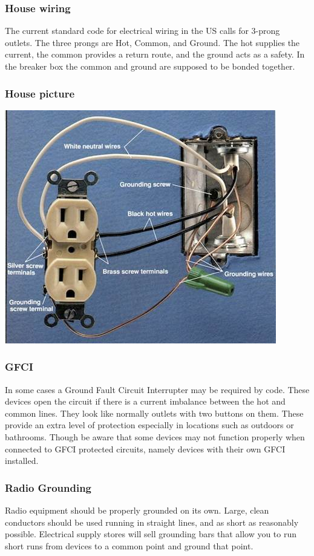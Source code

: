 \documentclass[10pt, handout]{beamer}
\begin{document}
\begin{frame}
\frametitle{House wiring}
The current standard code for electrical wiring in the US calls for 3-prong outlets. The three prongs are Hot, Common, and Ground. The hot supplies the current, the common provides a return route, and the ground acts as a safety. In the breaker box the common and ground are supposed to be bonded together.
\end{frame}

\begin{frame}
\frametitle{House picture}
\includegraphics[height=.9\textheight, width=.9\textwidth]{outletground.jpg}
\end{frame}

\begin{frame}
\frametitle{GFCI}
In some cases a Ground Fault Circuit Interrupter may be required by code. These devices open the circuit if there is a current imbalance between the hot and common lines. They look like normally outlets with two buttons on them. These provide an extra level of protection especially in locations such as outdoors or bathrooms. Though be aware that some devices may not function properly when connected to GFCI protected circuits, namely devices with their own GFCI installed.
\end{frame}

\begin{frame}
\frametitle{Radio Grounding}
Radio equipment should be properly grounded on its own. Large, clean conductors should be used running in straight lines, and as short as reasonably possible. Electrical supply stores will sell grounding bars that allow you to run short runs from devices to a common point and ground that point.
\end{frame}
\end{document}
